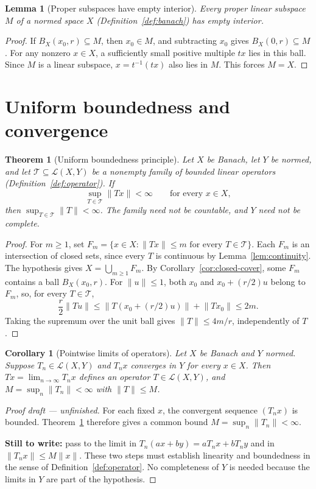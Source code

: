 \documentclass[11pt,a4paper]{article}
\theoremstyle{definition}
\theoremstyle{plain}
\newtheorem{theorem}[definition]{Theorem}
\newtheorem{lemma}[definition]{Lemma}
\newtheorem{corollary}[definition]{Corollary}
\newcommand{\norm}[1]{\lVert #1\rVert}
\begin{document}
\begin{lemma}[Proper subspaces have empty interior]\label{lem:proper-subspace}
Every proper linear subspace $M$ of a normed space $X$
(Definition~\ref{def:banach}) has empty interior.
\end{lemma}
\begin{proof}
If $B_X(x_0,r)\subseteq M$, then $x_0\in M$, and subtracting $x_0$
gives $B_X(0,r)\subseteq M$. For any nonzero $x\in X$, a sufficiently
small positive multiple $t x$ lies in this ball. Since $M$ is a linear
subspace, $x=t^{-1}(t x)$ also lies in $M$. This forces $M=X$.
\end{proof}

\section{Uniform boundedness and convergence}

\begin{theorem}[Uniform boundedness principle]\label{thm:uniform-boundedness}
Let $X$ be Banach, let $Y$ be normed, and let
$\mathcal T\subseteq\mathcal L(X,Y)$ be a nonempty family of bounded
linear operators (Definition~\ref{def:operator}). If
\[
 \sup_{T\in\mathcal T}\norm{Tx}<\infty\qquad\text{for every }x\in X,
\]
then $\sup_{T\in\mathcal T}\norm{T}<\infty$.
The family need not be countable, and $Y$ need not be complete.
\end{theorem}
\begin{proof}
For $m\ge1$, set
$F_m=\{x\in X:\norm{Tx}\le m\text{ for every }T\in\mathcal T\}$.
Each $F_m$ is an intersection of closed sets, since every $T$ is
continuous by Lemma~\ref{lem:continuity}. The hypothesis gives
$X=\bigcup_{m\ge1}F_m$.
By Corollary~\ref{cor:closed-cover}, some $F_m$ contains a ball
$B_X(x_0,r)$. For $\norm{u}\le1$, both $x_0$ and $x_0+(r/2)u$
belong to $F_m$, so, for every $T\in\mathcal T$,
\[
 \frac r2\norm{Tu}
 \le\norm{T(x_0+(r/2)u)}+\norm{Tx_0}\le2m.
\]
Taking the supremum over the unit ball gives $\norm{T}\le4m/r$,
independently of $T$.
\end{proof}

\begin{corollary}[Pointwise limits of operators]\label{cor:pointwise-limit}
Let $X$ be Banach and $Y$ normed. Suppose $T_n\in\mathcal L(X,Y)$
and $T_nx$ converges in $Y$ for every $x\in X$. Then
$Tx=\lim_{n\to\infty}T_nx$ defines an operator $T\in\mathcal L(X,Y)$,
and $M=\sup_n\norm{T_n}<\infty$ with $\norm{T}\le M$.
\end{corollary}
\begin{proof}[Proof draft --- unfinished]
For each fixed $x$, the convergent sequence $(T_nx)$ is bounded.
Theorem~\ref{thm:uniform-boundedness} therefore gives a common bound
$M=\sup_n\norm{T_n}<\infty$.

\textbf{Still to write:} pass to the limit in
$T_n(ax+by)=aT_nx+bT_ny$ and in $\norm{T_nx}\le M\norm{x}$.
These two steps must establish linearity and boundedness in the sense of
Definition~\ref{def:operator}. No completeness of $Y$ is needed because
the limits in $Y$ are part of the hypothesis.
\renewcommand{\qedsymbol}{}
\end{proof}
\end{document}
